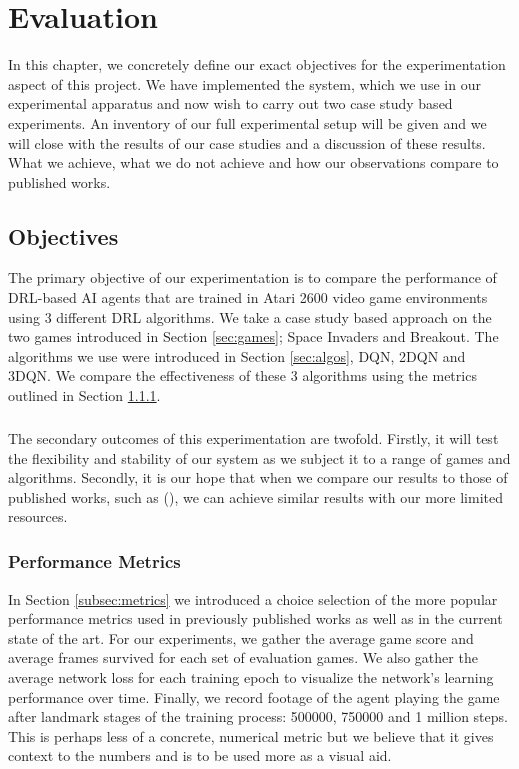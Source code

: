 \chapter{Evaluation}
In this chapter, we concretely define our exact objectives for the experimentation aspect of this
project. We have implemented the system, which we use in our experimental apparatus and now wish to
carry out two case study based experiments. An inventory of our full experimental setup will be
given and we will close with the results of our case studies and a discussion of these results. What
we achieve, what we do not achieve and how our observations compare to published works.

\section{Objectives} \label{sec:eval_objectives}
The primary objective of our experimentation is to compare the performance of DRL-based AI agents that are trained
in Atari 2600 video game environments using 3 different DRL algorithms. We take a case study based
approach on the two games introduced in Section \ref{sec:games}; Space Invaders and Breakout. The
algorithms we use were introduced in Section \ref{sec:algos}, DQN, 2DQN and 3DQN. We compare the
effectiveness of these 3 algorithms using the metrics outlined in Section \ref{subsec:performance}.
\paragraph{}

The secondary outcomes of this experimentation are twofold. Firstly, it will test the flexibility
and stability of our system as we subject it to a range of games and algorithms. Secondly, it is our
hope that when we compare our results to those of published works, such as
(\citet{human,doubleq,dueling}), we can achieve similar results with our more limited resources.
\paragraph{}

\subsection{Performance Metrics} \label{subsec:performance}
In Section \ref{subsec:metrics} we introduced a choice selection of the more popular performance
metrics used in previously published works as well as in the current state of the art. For our
experiments, we gather the average game score and average frames survived for each set of evaluation
games. We also gather the average network loss for each training epoch to visualize the network's
learning performance over time. Finally, we record footage of the agent playing the game after
landmark stages of the training process: 500000, 750000 and 1 million steps. This is perhaps less of a
concrete, numerical metric but we believe that it gives context to the numbers and is to be used
more as a visual aid.

